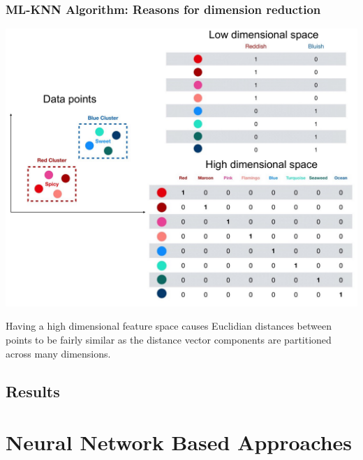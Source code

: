 \documentclass{beamer}
\begin{document}
\begin{frame}[t]
\frametitle{ML-KNN Algorithm: Reasons for dimension reduction}
\begin{center}
\includegraphics[width=0.7\textheight]{Images/DimRed.pdf}
\end{center}
Having a high dimensional feature space causes Euclidian distances between points to be fairly similar as the distance vector components are partitioned across many dimensions. 


\end{frame}

\subsection{Results}

\section{Neural Network Based Approaches}
\end{document}
